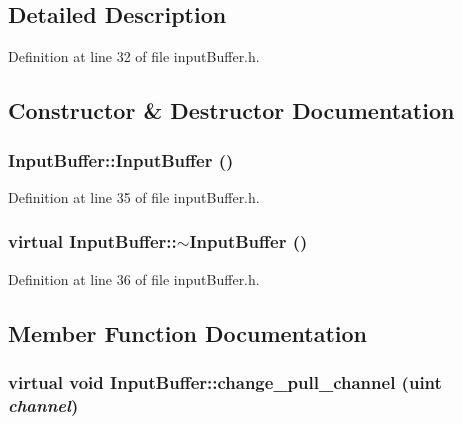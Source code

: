 \subsection{Detailed Description}


Definition at line 32 of file inputBuffer.h.

\subsection{Constructor \& Destructor Documentation}
\subsubsection[{InputBuffer}]{\setlength{\rightskip}{0pt plus 5cm}InputBuffer::InputBuffer ()\hspace{0.3cm}{\tt  [inline]}}\label{classInputBuffer_539e007478e6a19dd2c933e2fe6f6b5c}




Definition at line 35 of file inputBuffer.h.
\subsubsection[{$\sim$InputBuffer}]{\setlength{\rightskip}{0pt plus 5cm}virtual InputBuffer::$\sim$InputBuffer ()\hspace{0.3cm}{\tt  [inline, virtual]}}\label{classInputBuffer_c8e553cdc4097665450a7b83b797475c}




Definition at line 36 of file inputBuffer.h.

\subsection{Member Function Documentation}
\subsubsection[{change\_\-pull\_\-channel}]{\setlength{\rightskip}{0pt plus 5cm}virtual void InputBuffer::change\_\-pull\_\-channel ({\bf uint} {\em channel})\hspace{0.3cm}{\tt  [virtual]}}\label{classInputBuffer_86629ae58a881f42b19edfe07a53b8f0}


